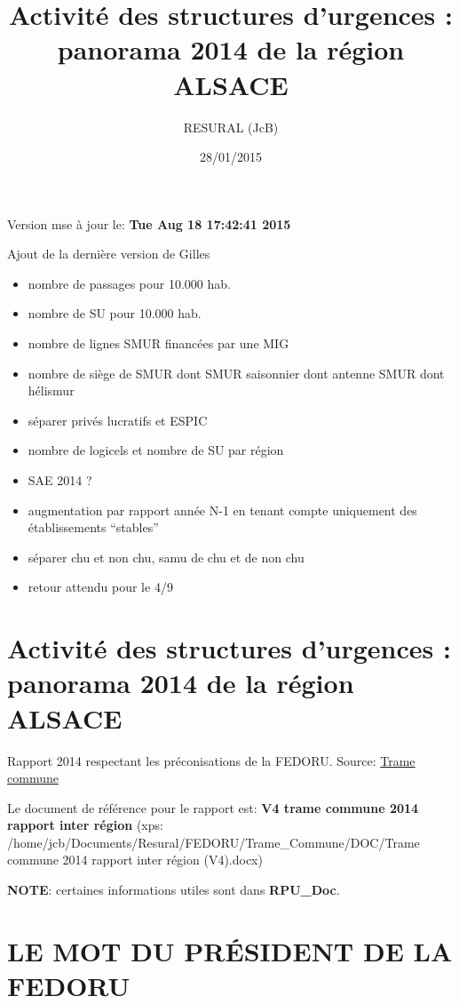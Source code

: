 \documentclass[]{article}
\title{Activité des structures d'urgences : panorama 2014 de la région ALSACE}
\author{RESURAL (JcB)}
\date{28/01/2015}
\begin{document}
\maketitle


{
\hypersetup{linkcolor=black}
\setcounter{tocdepth}{2}
\tableofcontents
}
Version mse à jour le: \textbf{Tue Aug 18 17:42:41 2015}

Ajout de la dernière version de Gilles

\begin{itemize}
\itemsep1pt\parskip0pt
\item
  nombre de passages pour 10.000 hab.
\item
  nombre de SU pour 10.000 hab.
\item
  nombre de lignes SMUR financées par une MIG
\item
  nombre de siège de SMUR dont SMUR saisonnier dont antenne SMUR dont
  hélismur
\item
  séparer privés lucratifs et ESPIC
\item
  nombre de logicels et nombre de SU par région
\item
  SAE 2014 ?
\item
  augmentation par rapport année N-1 en tenant compte uniquement des
  établissements ``stables''
\item
  séparer chu et non chu, samu de chu et de non chu
\item
  retour attendu pour le 4/9
\end{itemize}

\section{Activité des structures d'urgences : panorama 2014 de la région
ALSACE}\label{activite-des-structures-durgences-panorama-2014-de-la-region-alsace}

Rapport 2014 respectant les préconisations de la FEDORU. Source:
\href{https://docs.google.com/document/d/101LYVqVLeHZnrujfMm3aqBYfbOwx3CPEB3Y-Lbud2Ls/edit}{Trame
commune}

Le document de référence pour le rapport est: \textbf{V4 trame commune
2014 rapport inter région} (xps:
/home/jcb/Documents/Resural/FEDORU/Trame\_Commune/DOC/Trame commune 2014
rapport inter région (V4).docx)

\textbf{NOTE}: certaines informations utiles sont dans
\textbf{RPU\_Doc}.

\section{LE MOT DU PRÉSIDENT DE LA
FEDORU}\label{le-mot-du-president-de-la-fedoru}
\end{document}
